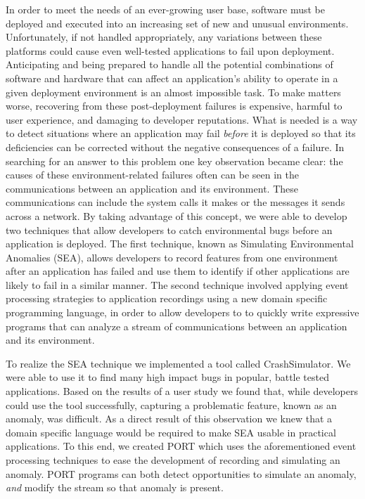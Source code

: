 In order to meet the needs of an ever-growing user base,
software must be deployed and executed into an
increasing set of new and unusual environments.
Unfortunately, if not handled appropriately, any
variations between these platforms
could cause even well-tested applications to fail upon deployment.
Anticipating and being prepared to handle all the potential combinations of
software and hardware that can affect an application’s ability to operate
in a given deployment environment is an almost impossible task.
To make matters worse,
recovering from these post-deployment failures is expensive,
harmful to user experience,
and damaging to developer reputations.
What is needed is a way to detect situations where an application may fail
\textit{before} it is deployed so that its deficiencies can be corrected without the negative consequences of a failure.
In searching for an answer to this problem one key observation became clear:
the causes of these environment-related failures
often can be seen in the
communications between an application and its environment. These communications can include the
system calls it makes or the messages it sends across a network.
By taking advantage of this concept,
we were able to develop two techniques that allow developers to catch environmental bugs
before an application is deployed. 
The first technique,
known as Simulating Environmental Anomalies (SEA),
allows developers to record features from one environment
after an application has failed and use them to identify if other
applications are likely to fail in a similar manner.
The second technique involved 
applying event processing strategies
to application recordings
using a new  domain specific programming language,
in order to allow developers to
to quickly write expressive programs that can analyze a stream of communications between an application and  its environment.

To realize the SEA technique we implemented a tool called CrashSimulator.
We were able to use it to find many high impact bugs in popular,
battle tested applications.
Based on the results of a user study we found that,
while developers could use the tool successfully,
capturing a problematic feature, known as an anomaly, was difficult.
As a direct result of this observation we knew that a domain specific language would be required to make SEA usable in practical applications.
 To this end, we created PORT
which uses the aforementioned event processing techniques
to ease the development of recording and simulating an anomaly.
PORT programs can both detect opportunities to
simulate an anomaly, \textit{and} modify the stream so that anomaly is present.

